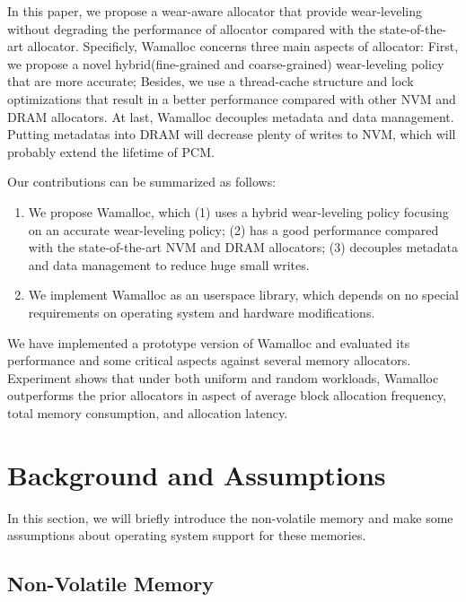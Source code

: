 \documentclass[10pt, conference, compsocconf]{IEEEtran}
\begin{document}
In this paper, we propose a wear-aware allocator that provide wear-leveling without degrading the performance of allocator compared with the state-of-the-art allocator. 
Specificly, Wamalloc concerns three main aspects of allocator:
First, we propose a novel hybrid(fine-grained and coarse-grained) wear-leveling policy that are more accurate;
Besides, we use a thread-cache structure and lock optimizations that result in a better performance compared with other NVM and DRAM allocators.
At last, Wamalloc decouples metadata and data management.
Putting metadatas into DRAM will decrease plenty of writes to NVM, which will probably extend the lifetime of PCM.

Our contributions can be summarized as follows:
\begin{enumerate}
    \item We propose Wamalloc, which
        (1) uses a hybrid wear-leveling policy focusing on an accurate wear-leveling policy;
        (2) has a good performance compared with the state-of-the-art NVM and DRAM allocators;
        (3) decouples metadata and data management to reduce huge small writes.
    \item We implement Wamalloc as an userspace library, which depends on no special requirements on operating system and hardware modifications.
\end{enumerate}

We have implemented a prototype version of Wamalloc and evaluated its performance and some critical aspects against several memory allocators.
Experiment shows that under both uniform and random workloads, 
Wamalloc outperforms the prior allocators in aspect of average block allocation frequency, total memory consumption, and allocation latency.


\section{Background and Assumptions}

In this section, we will briefly introduce the non-volatile memory and
make some assumptions about operating system support for these memories.

\subsection{Non-Volatile Memory}
\end{document}
